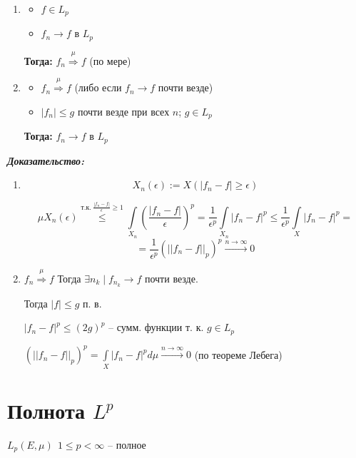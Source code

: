 \documentclass[paper=a4, fontsize=17pt]{article}
\begin{document}
\begin{enumerate}


	\item \begin{itemize}
		\item $ f \in L_p $
		\item $ f_n \rightarrow f $ в $ L_p $
	\end{itemize}
	\textbf{Тогда:} $ f_n \stackrel{\mu}{\Rightarrow} f $ (по мере)

	\item \begin{itemize}
		\item $ f_n \stackrel{\mu}{\Rightarrow} f $ (либо если $ f_n \rightarrow f $  почти везде)
		\item $ |f_n| \leq g $ почти везде при всех $n$; $g \in L_p$
	\end{itemize}
	\textbf{Тогда:} $ f_n \rightarrow f $ в $ L_p $
\end{enumerate}

\textbf{\emph{Доказательство:}}

\begin{enumerate}
	\item $$ X_n(\epsilon) := X(|f_n - f| \geq \epsilon) $$

	$$ \mu X_n(\epsilon) \overset{\text{т.к.}\ \frac{|f_n-f|}{\epsilon} \geq 1}{\leqslant} \int\limits_{X_n} (\frac{|f_n - f|}{\epsilon})^p  =
	\frac{1}{\epsilon^p} \int\limits_{X_n} |f_n - f|^p \leq
	\frac{1}{\epsilon^p} \int\limits_{X} |f_n - f|^p = $$
	$$ = \frac{1}{\epsilon^p} (||f_n - f||_p)^p \stackrel{n \rightarrow \infty}{\rightarrow} 0$$

	\item $ f_n \stackrel{\mu}{\Rightarrow} f $ Тогда $ \exists n_k \mid f_{n_k} \rightarrow f $ почти везде.

	Тогда $ |f| \leq g $ п. в.

	$ |f_n - f|^p \leq (2g)^p $ -- сумм. функции т. к. $ g \in L_p $

	$ (||f_n - f||_p)^p = \int\limits_{X} |f_n - f|^p d\mu \stackrel{n \rightarrow \infty}{\rightarrow} 0 $ (по теореме Лебега)

\end{enumerate}

\section{Полнота $L^p$}
$ L_p(E, \mu) ~ ~ 1 \leq p < \infty $ -- полное
\end{document}
